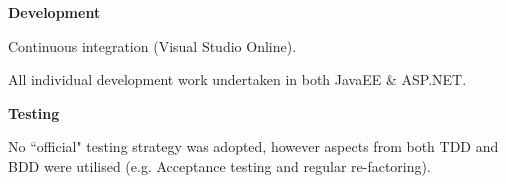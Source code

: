 \documentclass[10pt, compress]{beamer}
\begin{document}
\begin{frame}[fragile]
{  \textbf{Development}
   
   \begin{itemize}
  			\footnotesize{
  			\item Continuous integration (Visual Studio Online).
  			\item All individual development work undertaken in both JavaEE \& ASP.NET. 
  			}
  			
  		\end{itemize}
  		
  	\textbf{Testing}
  	
  	   \begin{itemize}
  			\footnotesize{
  			\item No ``official" testing strategy was adopted, however aspects from both TDD and BDD were utilised (e.g. Acceptance testing and regular re-factoring).
% 			
%  			
 			}
  		\end{itemize}
  	
   
   }
   
\end{frame}
\end{document}
